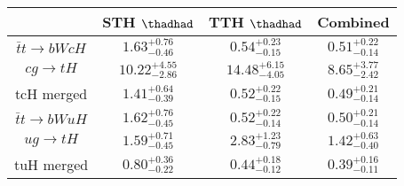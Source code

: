 
\centering
\begin{tabular}{|c|c|c|c|} \hline
 & STH $\thadhad$ & TTH $\thadhad$ & Combined\\\hline
$\bar{t}t\to bWcH$ & $1.63^{+0.76}_{-0.46}$ & $0.54^{+0.23}_{-0.15}$ & $0.51^{+0.22}_{-0.14}$\\\hline
$cg\to tH$ & $10.22^{+4.55}_{-2.86}$ & $14.48^{+6.15}_{-4.05}$ & $8.65^{+3.77}_{-2.42}$\\\hline
tcH merged & $1.41^{+0.64}_{-0.39}$ & $0.52^{+0.22}_{-0.15}$ & $0.49^{+0.21}_{-0.14}$\\\hline
$\bar{t}t\to bWuH$ & $1.62^{+0.76}_{-0.45}$ & $0.52^{+0.22}_{-0.14}$ & $0.50^{+0.21}_{-0.14}$\\\hline
$ug\to tH$ & $1.59^{+0.71}_{-0.45}$ & $2.83^{+1.23}_{-0.79}$ & $1.42^{+0.63}_{-0.40}$\\\hline
tuH merged & $0.80^{+0.36}_{-0.22}$ & $0.44^{+0.18}_{-0.12}$ & $0.39^{+0.16}_{-0.11}$\\\hline
\end{tabular}